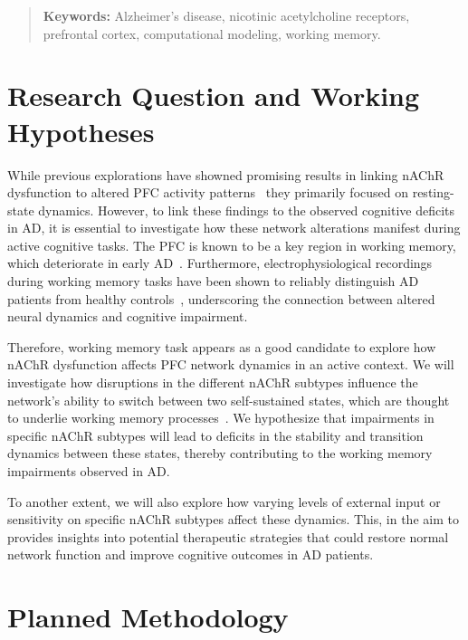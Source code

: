 \documentclass[10pt,letterpaper]{article}
\begin{document}
\begin{quote}
\small
\textbf{Keywords:} Alzheimer's disease, nicotinic acetylcholine receptors, prefrontal cortex, computational modeling, working memory.
\end{quote}

\section{Research Question and Working Hypotheses}

While previous explorations have showned promising results in linking nAChR dysfunction to altered PFC activity patterns~\citep{Rooy2021,Koukouli2025} they primarily focused on resting-state dynamics. However, to link these findings to the observed cognitive deficits in AD, it is essential to investigate how these network alterations manifest during active cognitive tasks.
The PFC is known to be a key region in working memory, which deteriorate in early AD~\citep{Huntley2010}. Furthermore, electrophysiological recordings during working memory tasks have been shown to reliably distinguish AD patients from healthy controls~\citep{Perpetuini2020}, underscoring the connection between altered neural dynamics and cognitive impairment.

Therefore, working memory task appears as a good candidate to explore how nAChR dysfunction affects PFC network dynamics in an active context. We will investigate how disruptions in the different nAChR subtypes influence the network's ability to switch between two self-sustained states, which are thought to underlie working memory processes~\citep{Compte2003}. We hypothesize that impairments in specific nAChR subtypes will lead to deficits in the stability and transition dynamics between these states, thereby contributing to the working memory impairments observed in AD.

To another extent, we will also explore how varying levels of external input or sensitivity on specific nAChR subtypes affect these dynamics. This, in the aim to provides insights into potential therapeutic strategies that could restore normal network function and improve cognitive outcomes in AD patients.

\section{Planned Methodology}
\end{document}
